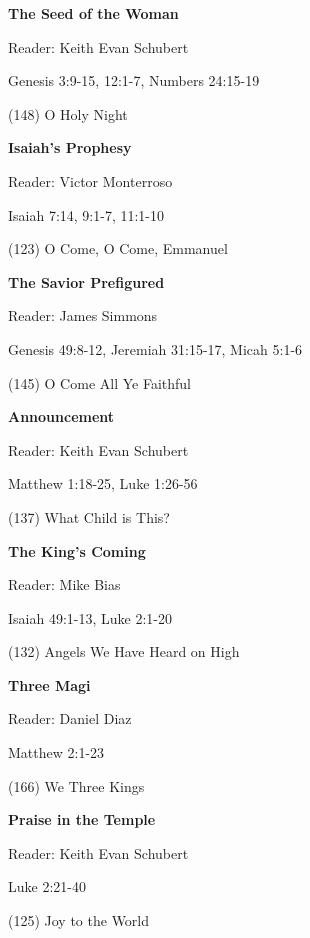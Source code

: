 \documentclass{article}
\begin{document}
\begin{center}
\textbf{}
\vspace{.1in}

{}
\end{center}
\vspace{.3in}









\thispagestyle{empty}


{\Large


\noindent\textbf{The Seed of the Woman}

Reader: Keith Evan Schubert

Genesis 3:9-15, 12:1-7, %
Numbers 24:15-19

(148) O Holy Night
\vspace{.1in}


\noindent\textbf{Isaiah's Prophesy}

Reader: Victor Monterroso

Isaiah 7:14, 9:1-7, 11:1-10

(123) O Come, O Come, Emmanuel
\vspace{.1in}

\noindent\textbf{The Savior Prefigured}

Reader: James Simmons

Genesis 49:8-12, Jeremiah 31:15-17, Micah 5:1-6

(145) O Come All Ye Faithful
\vspace{.1in}

\noindent\textbf{Announcement}

Reader:  Keith Evan Schubert

Matthew 1:18-25, Luke 1:26-56

(137) What Child is This?
\vspace{.1in}

\noindent\textbf{The King's Coming}

Reader: Mike Bias

Isaiah 49:1-13, Luke 2:1-20

(132) Angels We Have Heard on High
\vspace{.1in}

\noindent\textbf{Three Magi}

Reader: Daniel Diaz

Matthew 2:1-23

(166) We Three Kings
\vspace{.1in}

\noindent\textbf{Praise in the Temple}

Reader: Keith Evan Schubert

Luke 2:21-40

(125) Joy to the World

}
\end{document}
